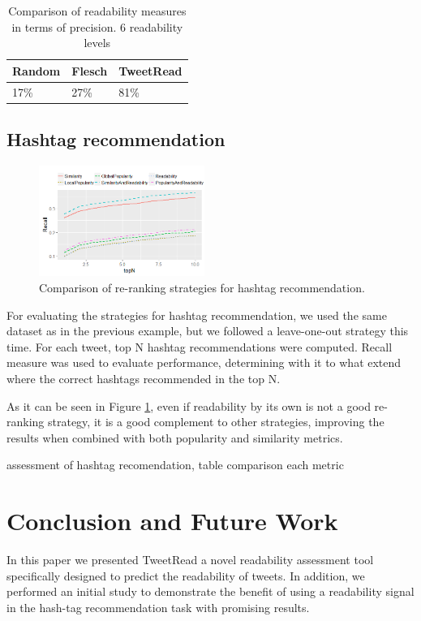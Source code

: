 \documentclass{sig-alternate-05-2015}
\begin{document}
\begin{table}[]
\centering
\begin{tabular}{|l|l|l|}
\hline
Random & Flesch & TweetRead \\ \hline
17\% & 27\% & 81\% \\ \hline
\end{tabular}
\caption{Comparison of readability measures in terms of precision. 6 readability levels}
\label{tab:read}
\end{table}

\subsection{Hashtag recommendation}



\begin{figure}[h]

\centering
\includegraphics[width=0.48\textwidth]{comparison}
\caption{Comparison of re-ranking strategies for hashtag recommendation.}
\label{fig:comparison}
\end{figure}



For evaluating the strategies for hashtag recommendation, we used the same dataset as in the previous example, but we followed a leave-one-out strategy this time. For each tweet, top N hashtag recommendations were computed. Recall measure was used to evaluate performance, determining with it to what extend where the correct hashtags recommended in the top N.

As it can be seen in Figure \ref{fig:comparison}, even if readability by its own is not a good re-ranking strategy, it is a good complement to other strategies, improving the results when combined with both popularity and similarity metrics.





 assessment of hashtag recomendation, table comparison each metric\\

\section{Conclusion and Future Work}
In this paper we presented TweetRead a novel readability assessment tool specifically designed to predict the readability of tweets. In addition, we performed an initial study to demonstrate the benefit of using a readability signal in the hash-tag recommendation task with promising results.
\end{document}
